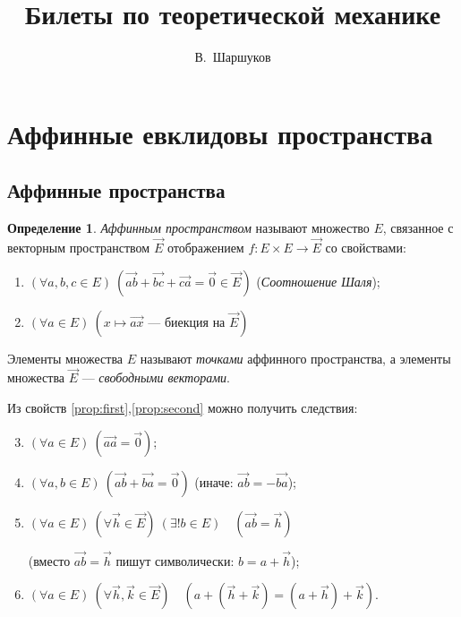 \documentclass{article}
\title{Билеты по теоретической механике}
\author{В.~Шаршуков}
\theoremstyle{definition}
\newtheorem{definition}{Определение}[section]
\theoremstyle{plain}
\theoremstyle{remark}
\numberwithin{equation}{section}
\newcommand{\vv}[1]{\overrightarrow{#1}}
\begin{document}
\maketitle
\pagebreak

\tableofcontents
\pagebreak


\section{Аффинные евклидовы пространства}

\subsection{Аффинные пространства}

\begin{definition}
  \textit{Аффинным пространством} называют множество $E$, связанное с векторным
  пространством $\vec{E}$ отображением $f: E \times E \to \vec{E}$ со
  свойствами:
  \begin{enumerate}
    \item\label{prop:first} $(\forall a,b,c \in E)~\left(\vv{ab} + \vv{bc} +
      \vv{ca} = \vec{0} \in \vec{E}\right)$ (\textit{Соотношение Шаля});
    \item\label{prop:second} $(\forall a \in E)~\left(x \mapsto \vv{ax}
      \text{ --- биекция на } \vec{E}\right)$
  \end{enumerate}
  Элементы множества $E$ называют \textit{точками} аффинного пространства, а
  элементы множества $\vec{E}$ --- \textit{свободными векторами}.
\end{definition}

Из свойств \ref{prop:first},\ref{prop:second} можно получить следствия:
\begin{enumerate}
    \setcounter{enumi}{2}
  \item $(\forall a \in E)~\left(\vv{aa} = \vec{0}\right)$;
  \item $(\forall a,b \in E)~\left(\vv{ab} + \vv{ba} = \vec{0}\right)$
    (иначе: $\vv{ab} = -\vv{ba}$);
  \item $(\forall a \in E)~(\forall \vec{h} \in \vec{E})~(\exists! b \in E)
    \quad \left(\vv{ab} = \vec{h}\right)$

    (вместо $\vv{ab} = \vec{h}$ пишут символически: $b = a + \vec{h}$);

  \item $(\forall a \in E)~(\forall \vec{h},\vec{k} \in \vec{E}) \quad
    \left(a + (\vec{h} + \vec{k}) = (a + \vec{h}) + \vec{k} \right)$.
\end{enumerate}
\end{document}
